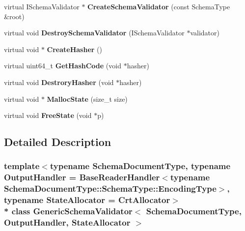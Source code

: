 \begin{DoxyCompactItemize}
\item 
virtual I\+Schema\+Validator $\ast$ {\bfseries Create\+Schema\+Validator} (const Schema\+Type \&root)\hypertarget{a00126_af074f9c8f2cfc07e1b3d3f8862e7ef11}{}\label{a00126_af074f9c8f2cfc07e1b3d3f8862e7ef11}

\item 
virtual void {\bfseries Destroy\+Schema\+Validator} (I\+Schema\+Validator $\ast$validator)\hypertarget{a00126_ae24fa298e328f1fd7dda2ef6267156d2}{}\label{a00126_ae24fa298e328f1fd7dda2ef6267156d2}

\item 
virtual void $\ast$ {\bfseries Create\+Hasher} ()\hypertarget{a00126_abc377481583ca2095fb784be88887faa}{}\label{a00126_abc377481583ca2095fb784be88887faa}

\item 
virtual uint64\+\_\+t {\bfseries Get\+Hash\+Code} (void $\ast$hasher)\hypertarget{a00126_ac01c45982a1f512e1ca06fe5544b0c0f}{}\label{a00126_ac01c45982a1f512e1ca06fe5544b0c0f}

\item 
virtual void {\bfseries Destrory\+Hasher} (void $\ast$hasher)\hypertarget{a00126_a007eef58be575dc562543d069ddd2710}{}\label{a00126_a007eef58be575dc562543d069ddd2710}

\item 
virtual void $\ast$ {\bfseries Malloc\+State} (size\+\_\+t size)\hypertarget{a00126_a7c999dfb3118aaa08495d60eee6d3732}{}\label{a00126_a7c999dfb3118aaa08495d60eee6d3732}

\item 
virtual void {\bfseries Free\+State} (void $\ast$p)\hypertarget{a00126_a4e250737a411af2969a9e585a7da4187}{}\label{a00126_a4e250737a411af2969a9e585a7da4187}

\end{DoxyCompactItemize}


\subsection{Detailed Description}
\subsubsection*{template$<$typename Schema\+Document\+Type, typename Output\+Handler = Base\+Reader\+Handler$<$typename Schema\+Document\+Type\+::\+Schema\+Type\+::\+Encoding\+Type$>$, typename State\+Allocator = Crt\+Allocator$>$\\*
class Generic\+Schema\+Validator$<$ Schema\+Document\+Type, Output\+Handler, State\+Allocator $>$}

